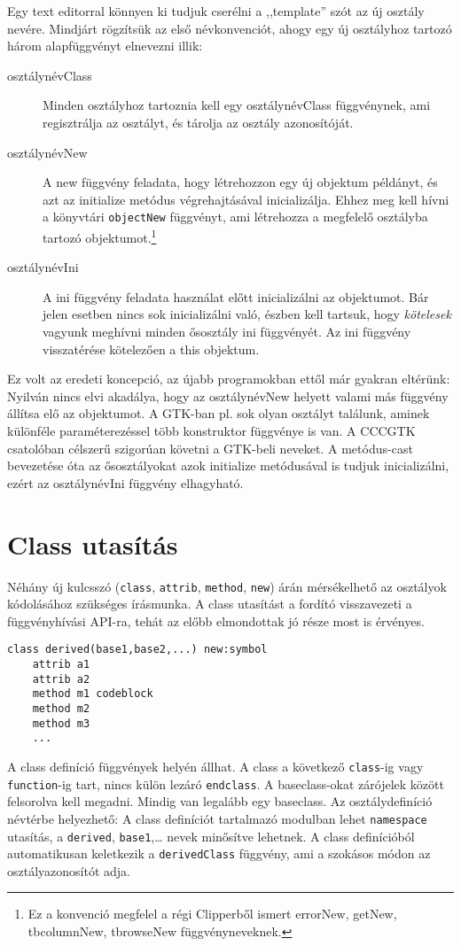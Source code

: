 Egy text editorral könnyen ki tudjuk cserélni a ,,template''
szót az új osztály nevére. Mindjárt rögzítsük az első névkonvenciót,
ahogy egy új osztályhoz tartozó három alapfüggvényt elnevezni illik:
\begin{description}
\item[osztálynévClass]
    Minden osztályhoz tartoznia kell egy osztálynévClass függvénynek,
    ami regisztrálja az osztályt, és tárolja az osztály azonosítóját.
\item[osztálynévNew]
    A new függvény feladata, hogy létrehozzon egy új objektum példányt,
    és azt az initialize metódus végrehajtásával inicializálja. 
    Ehhez meg kell hívni a könyvtári \verb!objectNew! függvényt,
    ami létrehozza a megfelelő osztályba tartozó objektumot.\footnote{%
Ez a konvenció megfelel a régi Clipperből ismert errorNew, getNew,
tbcolumnNew, tbrowseNew függvényneveknek.}
\item[osztálynévIni]
    A ini függvény feladata használat előtt inicializálni az objektumot.
    Bár jelen esetben nincs sok inicializálni való, észben kell tartsuk,
    hogy {\em kötelesek} vagyunk meghívni minden ősosztály ini függvényét.
    Az ini függvény visszatérése kötelezően a this objektum.
\end{description}

Ez volt az eredeti koncepció,
az újabb programokban ettől már gyakran eltérünk:
Nyilván nincs elvi akadálya, hogy az osztálynévNew helyett
valami más függvény állítsa elő az objektumot. A GTK-ban pl.
sok olyan osztályt találunk, aminek különféle paraméterezéssel
több konstruktor függvénye is van. A CCCGTK csatolóban célszerű
szigorúan követni a GTK-beli neveket. A metódus-cast bevezetése óta
az ősosztályokat azok initialize metódusával is tudjuk inicializálni,
ezért az osztálynévIni függvény elhagyható.


\label{CLASS}
\section{Class utasítás}

Néhány új kulcsszó 
(\verb!class!, \verb!attrib!, \verb!method!, \verb!new!)
árán  mérsékelhető az osztályok kódolásához szükséges írásmunka.
A class utasítást a fordító visszavezeti a függvényhívási API-ra, 
tehát az előbb elmondottak jó része most is érvényes.

\begin{verbatim}
class derived(base1,base2,...) new:symbol
    attrib a1
    attrib a2
    method m1 codeblock
    method m2 
    method m3
    ...
\end{verbatim}
A class definíció függvények helyén állhat.
A class a következő \verb!class!-ig vagy \verb!function!-ig tart,
nincs külön lezáró \verb!endclass!.
A  baseclass-okat zárójelek között felsorolva kell megadni.
Mindig van legalább egy baseclass.
Az osztálydefiníció  névtérbe helyezhető:
A class definíciót tartalmazó modulban lehet \verb!namespace!
utasítás, a \verb!derived!, \verb!base1!,\ldots 
nevek minősítve lehetnek. 
A class definícióból automatikusan keletkezik a
\verb!derivedClass! függvény, 
ami a szokásos módon az osztályazonosítót adja.

